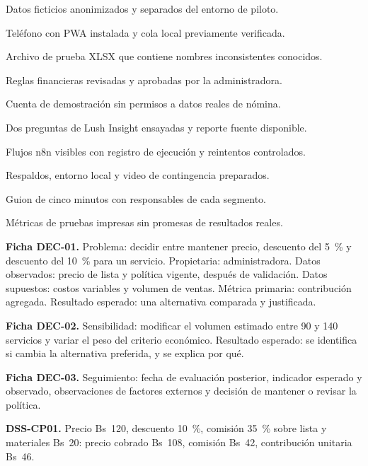 
\begin{vinetas}
\item[$\square$] Datos ficticios anonimizados y separados del entorno de piloto.
\item[$\square$] Teléfono con PWA instalada y cola local previamente verificada.
\item[$\square$] Archivo de prueba XLSX que contiene nombres inconsistentes conocidos.
\item[$\square$] Reglas financieras revisadas y aprobadas por la administradora.
\item[$\square$] Cuenta de demostración sin permisos a datos reales de nómina.
\item[$\square$] Dos preguntas de Lush Insight ensayadas y reporte fuente disponible.
\item[$\square$] Flujos n8n visibles con registro de ejecución y reintentos controlados.
\item[$\square$] Respaldos, entorno local y video de contingencia preparados.
\item[$\square$] Guion de cinco minutos con responsables de cada segmento.
\item[$\square$] Métricas de pruebas impresas sin promesas de resultados reales.
\end{vinetas}


\textbf{Ficha DEC-01.} Problema: decidir entre mantener precio, descuento del 5~\% y descuento del 10~\% para un servicio. Propietaria: administradora. Datos observados: precio de lista y política vigente, después de validación. Datos supuestos: costos variables y volumen de ventas. Métrica primaria: contribución agregada. Resultado esperado: una alternativa comparada y justificada.


\textbf{Ficha DEC-02.} Sensibilidad: modificar el volumen estimado entre 90 y 140 servicios y variar el peso del criterio económico. Resultado esperado: se identifica si cambia la alternativa preferida, y se explica por qué.


\textbf{Ficha DEC-03.} Seguimiento: fecha de evaluación posterior, indicador esperado y observado, observaciones de factores externos y decisión de mantener o revisar la política.



\textbf{DSS-CP01.} Precio Bs~120, descuento 10~\%, comisión 35~\% sobre lista y materiales Bs~20: precio cobrado Bs~108, comisión Bs~42, contribución unitaria Bs~46.


